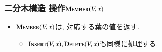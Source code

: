 \documentclass[main]{subfiles}
\begin{document}
\begin{frame}\frametitle{二分木構造 操作$\mathrm{\text{M\textsc{ember}}}(V,x)$}
\begin{itemize}
\item $\mathrm{\text{M\textsc{ember}}}(V,x)$は, 対応する葉の値を返す.
	\begin{itemize}
		\item $\mathrm{\text{I\textsc{nsert}}}(V,x), \mathrm{\text{D\textsc{elete}}}(V,x)$も同様に処理する.
	\end{itemize}
\end{itemize}
 

\end{frame}
\end{document}
